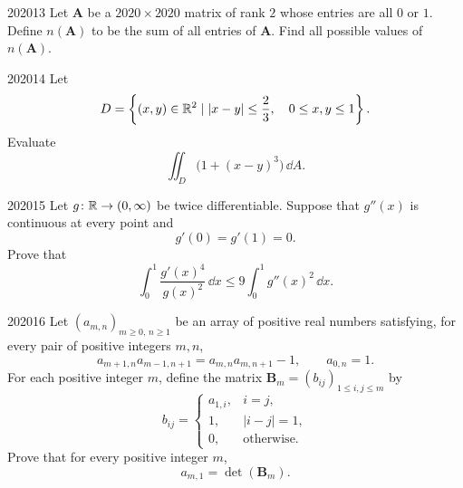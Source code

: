\begin{problem}{2020}{1}{3}
Let $\mathbf A$ be a $2020\times2020$ matrix of rank $2$ whose entries are all $0$ or $1$. Define $n(\mathbf A)$ to be the sum of all entries of $\mathbf A$. Find all possible values of $n(\mathbf A)$.
\end{problem}

\begin{problem}{2020}{1}{4}
Let
\[
    D=\left\{(x, y)\in\mathbb{R}^2\mid
    |x-y|\le\frac23, \quad 0\le x, y\le1\right\}.
\]
Evaluate
\[
    \iint_D\bigl(1+(x-y)^3\bigr)\, \dd A.
\]
\end{problem}

\begin{problem}{2020}{1}{5}
Let $g\colon\mathbb{R}\to(0, \infty)$ be twice differentiable. Suppose that $g''(x)$ is continuous at every point and
\[
    g'(0)=g'(1)=0.
\]
Prove that
\[
    \int_0^1\frac{g'(x)^4}{g(x)^2}\, \dd x
    \le
    9\int_0^1g''(x)^2\, \dd x.
\]
\end{problem}

\begin{problem}{2020}{1}{6}
Let $(a_{m, n})_{m\ge0, \, n\ge1}$ be an array of positive real numbers satisfying, for every pair of positive integers $m, n$,
\[
    a_{m+1, n}a_{m-1, n+1}
    =a_{m, n}a_{m, n+1}-1,
    \qquad
    a_{0, n}=1.
\]
For each positive integer $m$, define the matrix $\mathbf B_m=(b_{ij})_{1\le i, j\le m}$ by
\[
    b_{ij}=
    \begin{cases}
        a_{1, i}, & i=j, \\
        1, & |i-j|=1, \\
        0, & \text{otherwise}.
    \end{cases}
\]
Prove that for every positive integer $m$,
\[
    a_{m, 1}=\det(\mathbf B_m).
\]
\end{problem}
